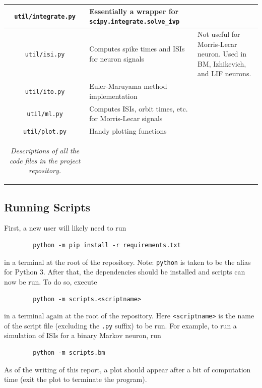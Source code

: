 \documentclass[letterpaper,12pt]{article}
\numberwithin{table}{section}
\numberwithin{figure}{section}
\numberwithin{equation}{section}
\newcommand{\ccaption}[1]{\caption{\textit{#1}}}
\begin{document}
\begin{flushleft}
\begin{center}
\begin{tabularx}{\linewidth}{ | c | Y | X | }
            \hline
            \texttt{util/integrate.py} & Essentially a wrapper for \texttt{scipy.integrate.solve\_ivp
            } & \\
            \hline
            \texttt{util/isi.py} & Computes spike times and ISIs for neuron signals & Not useful for Morris-Lecar neuron. Used in BM, Izhikevich, and LIF neurons. \\
            \hline
            \texttt{util/ito.py} & Euler-Maruyama method implementation & \\
            \hline
            \texttt{util/ml.py} & Computes ISIs, orbit times, etc. for Morris-Lecar signals & \\
            \hline
            \texttt{util/plot.py} & Handy plotting functions & \\
            \hline

            \captionsetup{width=\linewidth}
            \ccaption{Descriptions of all the code files in the project repository.}
            \label{tab:code-files}

        \end{tabularx}
    
    \end{center}

    \subsection{Running Scripts}
    First, a new user will likely need to run
    \begin{lstlisting}
        python -m pip install -r requirements.txt
    \end{lstlisting}
    in a terminal at the root of the repository. Note: \texttt{python} is taken to be the alias for Python 3. After that, the dependencies should be installed and scripts can now be run. To do so, execute
    \begin{lstlisting}
        python -m scripts.<scriptname>
    \end{lstlisting}
    in a terminal again at the root of the repository. Here \texttt{<scriptname>} is the name of the script file (excluding the \texttt{.py} suffix) to be run. For example, to run a simulation of ISIs for a binary Markov neuron, run
    \begin{lstlisting}
        python -m scripts.bm
    \end{lstlisting}
    As of the writing of this report, a plot should appear after a bit of computation time (exit the plot to terminate the program).


\end{flushleft}
\end{document}
